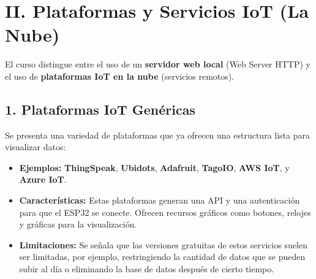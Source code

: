 \documentclass{article}
\begin{document}
\section*{II. Plataformas y Servicios IoT (La Nube)}

El curso distingue entre el uso de un \textbf{servidor web local} (Web Server HTTP) y el uso de \textbf{plataformas IoT en la nube} (servicios remotos).

\subsection*{1. Plataformas IoT Genéricas}
Se presenta una variedad de plataformas que ya ofrecen una estructura lista para visualizar datos:
\begin{itemize}
    \item \textbf{Ejemplos:} \textbf{ThingSpeak}, \textbf{Ubidots}, \textbf{Adafruit}, \textbf{TagoIO}, \textbf{AWS IoT}, y \textbf{Azure IoT}.
    \item \textbf{Características:} Estas plataformas generan una API y una autenticación para que el ESP32 se conecte. Ofrecen recursos gráficos como botones, relojes y gráficas para la visualización.
    \item \textbf{Limitaciones:} Se señala que las versiones gratuitas de estos servicios suelen ser limitadas, por ejemplo, restringiendo la cantidad de datos que se pueden subir al día o eliminando la base de datos después de cierto tiempo.
\end{itemize}
\end{document}
